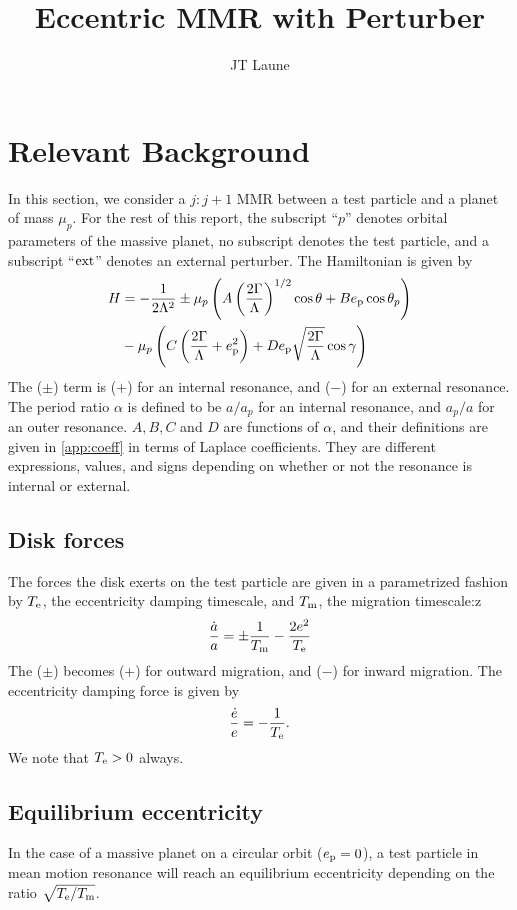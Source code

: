 \documentclass{article}
\title{Eccentric MMR with Perturber}
\author{JT Laune}
\newcommand{\ep}{e_{\rm p}}
\newcommand{\Te}{T_{\rm e}}
\newcommand{\Tm}{T_{\rm m}}
\begin{document}
\maketitle
\section{Relevant Background}
In this section, we consider a $j:j+1$ MMR between a test particle and
a planet of mass $\mu_p$.  For the rest of this report, the subscript
``$p$'' denotes orbital parameters of the massive planet, no subscript
denotes the test particle, and a subscript ``$\rm{ext}$'' denotes an
external perturber.  The Hamiltonian is given by
\begin{align}\label{eq:H}
  H
  &= - \frac{1}{2\Lambda^2} \pm \mu_p\left(A
    \left(\frac{2\Gamma}{\Lambda}\right)^{1/2}\cos\theta + B
    \ep\cos\theta_p\right) \nonumber\\
  &- \mu_p \left(C\left(\frac{2\Gamma}{\Lambda}
      + \ep^2\right) + D\ep
    \sqrt{\frac{2\Gamma}{\Lambda}}\cos\gamma\right)
\end{align}
The ($\pm$) term is ($+$) for an internal resonance, and ($-$) for an
external resonance.  The period ratio $\alpha$ is defined to be
$a/a_p$ for an internal resonance, and $a_p/a$ for an outer resonance.
$A,B,C$ and $D$ are functions of $\alpha$, and their definitions are
given in \ref{app:coeff} in terms of Laplace coefficients. They are
different expressions, values, and signs depending on whether or not
the resonance is internal or external.

\subsection{Disk forces}
The forces the disk exerts on the test particle are given
in a parametrized fashion by $\Te$, the eccentricity damping timescale,
and $\Tm$, the migration timescale:z
\begin{equation}
  \label{eq:dota}
  \frac{\dot{a}}{a} = \pm\frac{1}{\Tm} - \frac{2e^2}{\Te}
\end{equation}
The ($\pm$) becomes ($+$) for outward migration, and ($-$) for inward migration. 
The eccentricity damping force is given by
\[ \frac{\dot{e}}{e} = -\frac{1}{\Te}. \]
We note that $\Te>0$ always.

\subsection{Equilibrium eccentricity}
In the case of a massive planet on a circular orbit ($\ep=0$), a test
particle in mean motion resonance will reach an equilibrium
eccentricity depending on the ratio $\sqrt{\Te/\Tm}$.
\end{document}
